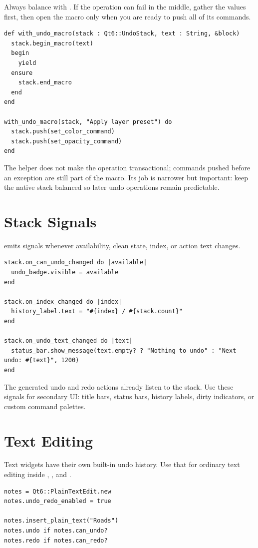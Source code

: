 Always balance  with . If the operation can fail in the middle, gather the values first, then open the macro only when you are ready to push all of its commands.

\begin{lstlisting}[style=crystal]
def with_undo_macro(stack : Qt6::UndoStack, text : String, &block)
  stack.begin_macro(text)
  begin
    yield
  ensure
    stack.end_macro
  end
end

with_undo_macro(stack, "Apply layer preset") do
  stack.push(set_color_command)
  stack.push(set_opacity_command)
end
\end{lstlisting}

The helper does not make the operation transactional; commands pushed before an exception are still part of the macro. Its job is narrower but important: keep the native stack balanced so later undo operations remain predictable.

\section{Stack Signals}

 emits signals whenever availability, clean state, index, or action text changes.

\begin{lstlisting}[style=crystal]
stack.on_can_undo_changed do |available|
  undo_badge.visible = available
end

stack.on_index_changed do |index|
  history_label.text = "#{index} / #{stack.count}"
end

stack.on_undo_text_changed do |text|
  status_bar.show_message(text.empty? ? "Nothing to undo" : "Next undo: #{text}", 1200)
end
\end{lstlisting}

The generated undo and redo actions already listen to the stack. Use these signals for secondary UI: title bars, status bars, history labels, dirty indicators, or custom command palettes.

\section{Text Editing}

Text widgets have their own built-in undo history. Use that for ordinary text editing inside , , and .

\begin{lstlisting}[style=crystal]
notes = Qt6::PlainTextEdit.new
notes.undo_redo_enabled = true

notes.insert_plain_text("Roads")
notes.undo if notes.can_undo?
notes.redo if notes.can_redo?
\end{lstlisting}

